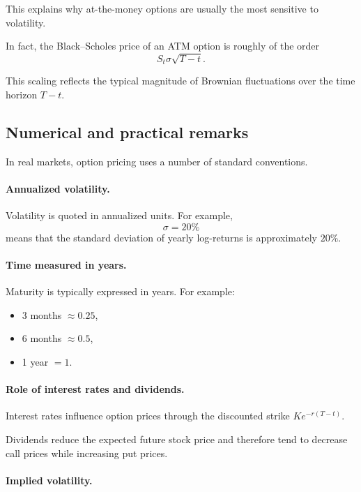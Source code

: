 \documentclass[11pt]{article}
\newcommand{\1}{\mathbf{1}}
\theoremstyle{plain}
\theoremstyle{definition}
\theoremstyle{remark}
\begin{document}
This explains why at-the-money options are usually the most sensitive to
volatility.

In fact, the Black--Scholes price of an ATM option is roughly of the order
\[
S_t \sigma \sqrt{T-t}.
\]

This scaling reflects the typical magnitude of Brownian fluctuations over
the time horizon \(T-t\).

\subsection{Numerical and practical remarks}

In real markets, option pricing uses a number of standard conventions.

\paragraph{Annualized volatility.}

Volatility is quoted in annualized units.
For example,
\[
\sigma = 20\%
\]
means that the standard deviation of yearly log-returns is approximately
\(20\%\).

\paragraph{Time measured in years.}

Maturity is typically expressed in years.
For example:
\begin{itemize}[leftmargin=1.4em]
\item 3 months \( \approx 0.25 \),
\item 6 months \( \approx 0.5 \),
\item 1 year \( = 1 \).
\end{itemize}

\paragraph{Role of interest rates and dividends.}

Interest rates influence option prices through the discounted strike
\(K e^{-r(T-t)}\).

Dividends reduce the expected future stock price and therefore tend to
decrease call prices while increasing put prices.

\paragraph{Implied volatility.}
\end{document}
